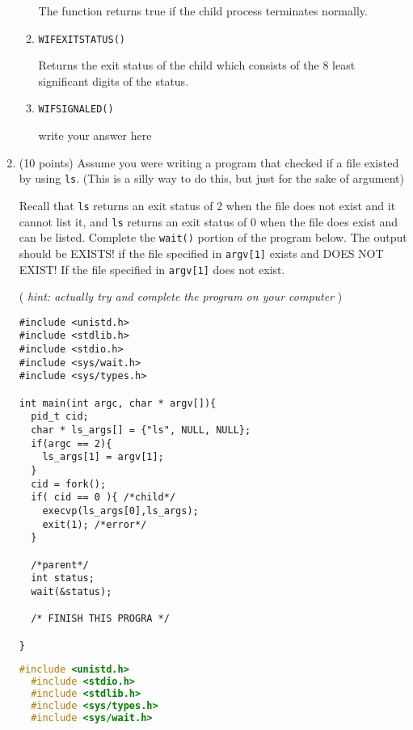 \documentclass{article}[9pt]
\newenvironment{answerfont}{\fontfamily{qhv}\selectfont}{\par}
\newenvironment{myanswer}{\begin{mdframed}\begin{answerfont}}{\end{answerfont}\end{mdframed}}
\begin{document}
\begin{enumerate}
\begin{enumerate}
    \begin{myanswer}
    The function returns true if the child process terminates normally.
  \end{myanswer}

\item \texttt{WIFEXITSTATUS()}

    \begin{myanswer}
    Returns the exit status of the child which consists of the 8 least significant digits of the status.
  \end{myanswer}

\item \texttt{WIFSIGNALED()}

    \begin{myanswer}
    write your answer here
  \end{myanswer}

\end{enumerate}

\item (10 points) Assume you were writing a program that checked if a file
existed by using \texttt{ls}. (This is a silly way to do this, but just
for the sake of argument)

Recall that \texttt{ls} returns an exit status of 2 when the file does
not exist and it cannot list it, and \texttt{ls} returns an exit status
of 0 when the file does exist and can be listed. Complete the
\texttt{wait()} portion of the program below. The output should be
EXISTS! if the file specified in \texttt{argv[1]} exists and DOES NOT
EXIST! If the file specified in \texttt{argv[1]} does not exist.

( \emph{hint: actually try and complete the program on your computer} )

\begin{verbatim}
#include <unistd.h>
#include <stdlib.h>
#include <stdio.h>
#include <sys/wait.h>
#include <sys/types.h>

int main(int argc, char * argv[]){
  pid_t cid;
  char * ls_args[] = {"ls", NULL, NULL};
  if(argc == 2){
    ls_args[1] = argv[1];
  }
  cid = fork();
  if( cid == 0 ){ /*child*/
    execvp(ls_args[0],ls_args);
    exit(1); /*error*/
  }

  /*parent*/
  int status;
  wait(&status);

  /* FINISH THIS PROGRA */

}
\end{verbatim}

  \begin{myanswer}
  \begin{lstlisting}[language=c]
  #include <unistd.h>
  #include <stdio.h>
  #include <stdlib.h>
  #include <sys/types.h>
  #include <sys/wait.h>


\end{lstlisting}
\end{myanswer}
\end{enumerate}
\end{document}
